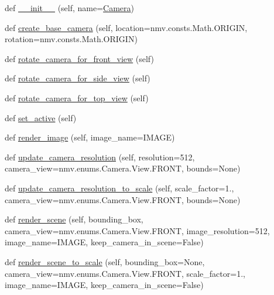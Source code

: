 \begin{DoxyCompactItemize}
\item 
def \hyperlink{classmeshy_1_1neuromorphovis_1_1rendering_1_1camera_1_1camera_1_1Camera_adc11b6284db351bb51d797c3f72de6fd}{\+\_\+\+\_\+init\+\_\+\+\_\+} (self, name=\textquotesingle{}\hyperlink{classmeshy_1_1neuromorphovis_1_1rendering_1_1camera_1_1camera_1_1Camera}{Camera}\textquotesingle{})
\item 
def \hyperlink{classmeshy_1_1neuromorphovis_1_1rendering_1_1camera_1_1camera_1_1Camera_a4794d8cd94393fa7315ff83abf4db6e5}{create\+\_\+base\+\_\+camera} (self, location=nmv.\+consts.\+Math.\+O\+R\+I\+G\+IN, rotation=nmv.\+consts.\+Math.\+O\+R\+I\+G\+IN)
\item 
def \hyperlink{classmeshy_1_1neuromorphovis_1_1rendering_1_1camera_1_1camera_1_1Camera_ab016d195b680225168aab9f2446c12e3}{rotate\+\_\+camera\+\_\+for\+\_\+front\+\_\+view} (self)
\item 
def \hyperlink{classmeshy_1_1neuromorphovis_1_1rendering_1_1camera_1_1camera_1_1Camera_abb42194a0dfe9e1cf608dc8f7b2a192a}{rotate\+\_\+camera\+\_\+for\+\_\+side\+\_\+view} (self)
\item 
def \hyperlink{classmeshy_1_1neuromorphovis_1_1rendering_1_1camera_1_1camera_1_1Camera_a36903206497125d60948a46da131924c}{rotate\+\_\+camera\+\_\+for\+\_\+top\+\_\+view} (self)
\item 
def \hyperlink{classmeshy_1_1neuromorphovis_1_1rendering_1_1camera_1_1camera_1_1Camera_a6d127ab9ae05968d65195d4603e3fdb5}{set\+\_\+active} (self)
\item 
def \hyperlink{classmeshy_1_1neuromorphovis_1_1rendering_1_1camera_1_1camera_1_1Camera_abcf59dab27c59322b1ae8d9a794674a1}{render\+\_\+image} (self, image\+\_\+name=\textquotesingle{}I\+M\+A\+GE\textquotesingle{})
\item 
def \hyperlink{classmeshy_1_1neuromorphovis_1_1rendering_1_1camera_1_1camera_1_1Camera_aaebb9bb2bdb245ef08423e33ffbbd761}{update\+\_\+camera\+\_\+resolution} (self, resolution=512, camera\+\_\+view=nmv.\+enums.\+Camera.\+View.\+F\+R\+O\+NT, bounds=None)
\item 
def \hyperlink{classmeshy_1_1neuromorphovis_1_1rendering_1_1camera_1_1camera_1_1Camera_a0bf7d770c3780860ae65959071f355da}{update\+\_\+camera\+\_\+resolution\+\_\+to\+\_\+scale} (self, scale\+\_\+factor=1., camera\+\_\+view=nmv.\+enums.\+Camera.\+View.\+F\+R\+O\+NT, bounds=None)
\item 
def \hyperlink{classmeshy_1_1neuromorphovis_1_1rendering_1_1camera_1_1camera_1_1Camera_ad5874298bb04051e8127fbe6a28adcef}{render\+\_\+scene} (self, bounding\+\_\+box, camera\+\_\+view=nmv.\+enums.\+Camera.\+View.\+F\+R\+O\+NT, image\+\_\+resolution=512, image\+\_\+name=\textquotesingle{}I\+M\+A\+GE\textquotesingle{}, keep\+\_\+camera\+\_\+in\+\_\+scene=False)
\item 
def \hyperlink{classmeshy_1_1neuromorphovis_1_1rendering_1_1camera_1_1camera_1_1Camera_a8e57141ea28e14fa5c6c44b6e899612d}{render\+\_\+scene\+\_\+to\+\_\+scale} (self, bounding\+\_\+box=None, camera\+\_\+view=nmv.\+enums.\+Camera.\+View.\+F\+R\+O\+NT, scale\+\_\+factor=1., image\+\_\+name=\textquotesingle{}I\+M\+A\+GE\textquotesingle{}, keep\+\_\+camera\+\_\+in\+\_\+scene=False)
\end{DoxyCompactItemize}
